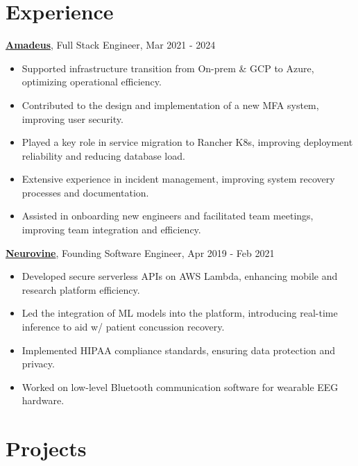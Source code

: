 \section*{Experience}

\noindent
\textbf{\href{https://amadeus.com/en}{Amadeus}}, Full Stack Engineer, Mar 2021 - 2024
\begin{itemize}
    \setlength\itemsep{0em}
    \item Supported infrastructure transition from On-prem \& GCP to Azure, optimizing operational efficiency.
    \item Contributed to the design and implementation of a new MFA system, improving user security.
    \item Played a key role in service migration to Rancher K8s, improving deployment reliability and reducing database load.
    \item Extensive experience in incident management, improving system recovery processes and documentation.
    \item Assisted in onboarding new engineers and facilitated team meetings, improving team integration and efficiency.
\end{itemize}

\noindent
\textbf{\href{https://neurovine.ai}{Neurovine}}, Founding Software Engineer, Apr 2019 - Feb 2021
\begin{itemize}
    \setlength\itemsep{0em}
    \item Developed secure serverless APIs on AWS Lambda, enhancing mobile and research platform efficiency.
    \item Led the integration of ML models into the platform, introducing real-time inference to aid w/ patient concussion recovery.
    \item Implemented HIPAA compliance standards, ensuring data protection and privacy.
    \item Worked on low-level Bluetooth communication software for wearable EEG hardware.
\end{itemize}

\section*{Projects}

